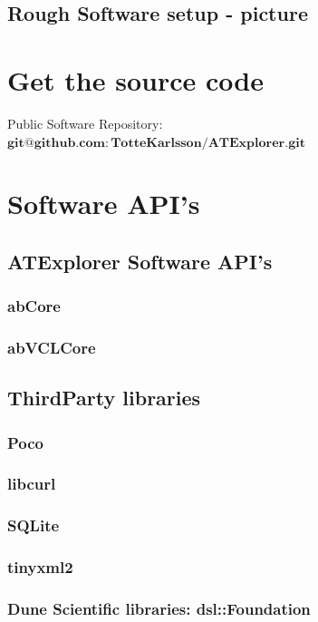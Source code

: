 \documentclass[11pt,fleqn]{book} %
\begin{document}
\section{Rough Software setup - picture}

\begin{appendices}
\chapter{Get the source code}

Public Software Repository: $\mathbf{git@github.com:TotteKarlsson/ATExplorer.git}$

\chapter{Software API's}

\section{ATExplorer Software API's}
\subsection{abCore}
\subsection{abVCLCore}

\section{ThirdParty libraries}
\subsection{Poco}
\subsection{libcurl}
\subsection{SQLite}
\subsection{tinyxml2}
\subsection{Dune Scientific libraries: dsl::Foundation}

\end{appendices}
\end{document}
